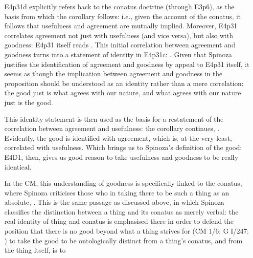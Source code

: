 \documentclass{article}
\newcommand{\dash}{\unskip{—}}
\begin{document}
E4p31d explicitly refers back to the conatus doctrine (through E3p6), as the basis from which the corollary follows: i.e., given the account of the conatus, it follows that usefulness and agreement are mutually implied. Moreover, E4p31 correlates agreement not just with usefulness (and vice versa), but also with goodness: E4p31 itself reads . This initial correlation between agreement and goodness turns into a statement of identity in E4p31c: . Given that Spinoza justifies the identification of agreement and goodness by appeal to E4p31 itself, it seems as though the implication between agreement and goodness in the proposition should be understood as an identity rather than a mere correlation: the good just is what agrees with our nature, and what agrees with our nature just is the good.

This identity statement is then used as the basis for a restatement of the correlation between agreement and usefulness: the corollary continues, . Evidently, the good is identified with agreement, which is, at the very least, correlated with usefulness. Which brings us to Spinoza's definition of the good:  E4D1, then, gives us good reason to take usefulness and goodness to be really identical.

In the CM, this understanding of goodness is specifically linked to the conatus, where Spinoza criticises those who  in taking there to be such a thing as an absolute, . This is the same passage as discussed above, in which Spinoza classifies the distinction between a thing and its conatus as merely verbal: the real identity of thing and conatus is emphasised there in order to defend the position that there is no good beyond what a thing strives for (CM 1/6; G \RN{1}/247; {\cite[313]{C1}}) \dash to take the good to be ontologically distinct from a thing's conatus, and from the thing itself, is to 
\end{document}
